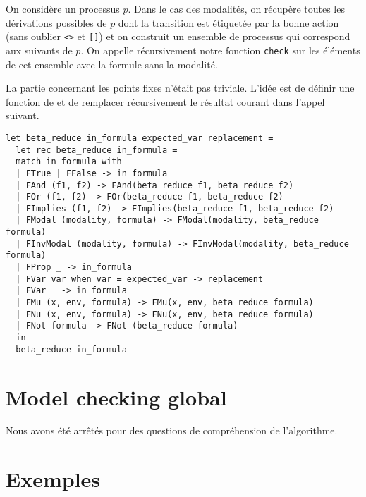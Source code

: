 \documentclass[a4paper]{article}
\begin{document}
On considère un processus $p$. Dans le cas des modalités, on récupère
toutes les dérivations possibles de $p$ dont la transition est
étiquetée par la bonne action (sans oublier \texttt{<>}
et \texttt{[]}) et on construit un ensemble de processus qui
correspond aux suivants de $p$. On appelle récursivement notre
fonction \texttt{check} sur les éléments de cet ensemble avec la
formule sans la modalité.

La partie concernant les points fixes n'était pas triviale. L'idée est
de définir une fonction de  et de remplacer
récursivement le résultat courant dans l'appel suivant.

\begin{lstlisting}[language=caml]
let beta_reduce in_formula expected_var replacement =
  let rec beta_reduce in_formula =
  match in_formula with
  | FTrue | FFalse -> in_formula
  | FAnd (f1, f2) -> FAnd(beta_reduce f1, beta_reduce f2)
  | FOr (f1, f2) -> FOr(beta_reduce f1, beta_reduce f2)
  | FImplies (f1, f2) -> FImplies(beta_reduce f1, beta_reduce f2)
  | FModal (modality, formula) -> FModal(modality, beta_reduce formula)
  | FInvModal (modality, formula) -> FInvModal(modality, beta_reduce formula)
  | FProp _ -> in_formula
  | FVar var when var = expected_var -> replacement
  | FVar _ -> in_formula
  | FMu (x, env, formula) -> FMu(x, env, beta_reduce formula)
  | FNu (x, env, formula) -> FNu(x, env, beta_reduce formula)
  | FNot formula -> FNot (beta_reduce formula)
  in
  beta_reduce in_formula
\end{lstlisting}


\section{Model checking global}

Nous avons été arrêtés pour des questions de compréhension de
l'algorithme. 



\section{Exemples}
\end{document}
